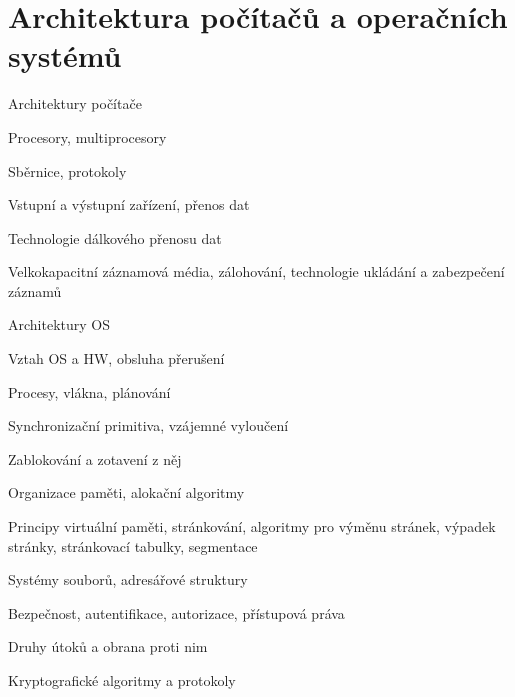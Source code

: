 \section{Architektura počítačů a operačních systémů}
\begin{pozadavky}
\begin{pitemize}
\item Architektury počítače
\item Procesory, multiprocesory
\item Sběrnice, protokoly
\item Vstupní a výstupní zařízení, přenos dat
\item Technologie dálkového přenosu dat
\item Velkokapacitní záznamová média, zálohování, technologie ukládání a zabezpečení záznamů
\item Architektury OS
\item Vztah OS a HW, obsluha přerušení
\item Procesy, vlákna, plánování
\item Synchronizační primitiva, vzájemné vyloučení
\item Zablokování a zotavení z něj
\item Organizace paměti, alokační algoritmy
\item Principy virtuální paměti, stránkování, algoritmy pro výměnu stránek, výpadek stránky, stránkovací tabulky, segmentace
\item Systémy souborů, adresářové struktury
\item Bezpečnost, autentifikace, autorizace, přístupová práva
\item Druhy útoků a obrana proti nim
\item Kryptografické algoritmy a protokoly
\end{pitemize}
\end{pozadavky}








